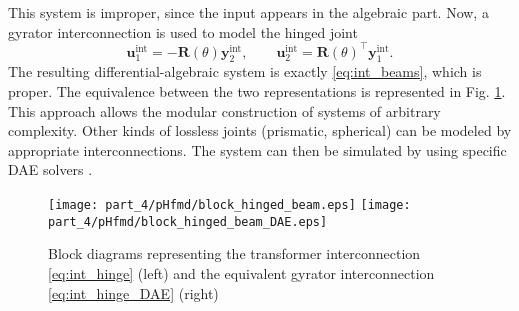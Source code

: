 This system is improper, since the input appears in the algebraic part. Now, a gyrator interconnection is used to model the hinged joint
\begin{equation}
\label{eq:int_hinge_DAE}
\mathbf{u}_1^{\text{int}} = -\mathbf{R}(\theta) \mathbf{y}_2^{\text{int}}, \qquad
\mathbf{u}_2^{\text{int}} = \mathbf{R}(\theta)^\top \mathbf{y}_1^{\text{int}}.
\end{equation}
The resulting differential-algebraic system is exactly \eqref{eq:int_beams}, which is proper. The equivalence between the two representations is represented in Fig. \ref{fig:beam_int_block}. This approach allows the modular construction of systems of arbitrary complexity. Other kinds of lossless joints (prismatic, spherical) can be modeled by appropriate interconnections. The system can then be simulated by using specific DAE solvers \cite{brenan1995dae}. 

\begin{figure}[t]
	\centering
	\texttt{[image: part\_4/pHfmd/block\_hinged\_beam.eps]} \hspace{.5cm}
	\texttt{[image: part\_4/pHfmd/block\_hinged\_beam\_DAE.eps]} 	
	\caption{Block diagrams representing the transformer interconnection \eqref{eq:int_hinge} (left) and the equivalent gyrator interconnection \eqref{eq:int_hinge_DAE} (right)}
	\label{fig:beam_int_block}
\end{figure}

